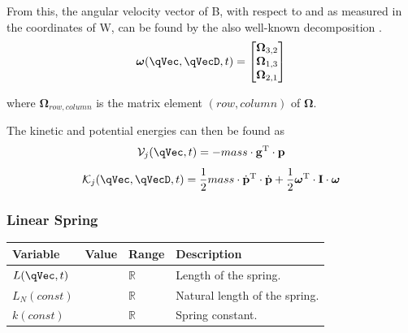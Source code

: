 \documentclass[11pt]{article}
\begin{document}
From this, the angular velocity vector of B, with respect to and as measured in the coordinates of W, can be found by the also well-known decomposition \cite{BJ3-43}.
\begin{equation}
    \bm{\omega}(\qVec, \qVecD, t) = \begin{bmatrix}\bm{\Omega}_{3,2} \\ \bm{\Omega}_{1,3} \\ \bm{\Omega}_{2,1}\end{bmatrix}
\end{equation}

where $\bm{\Omega}_{row,column}$ is the matrix element $(row,column)$ of $\bm{\Omega}$.

The kinetic and potential energies can then be found as
\begin{equation}
    \mathcal{V}_j(\qVec, t) = -mass\cdot\mathbf{g}^{\mathrm{T}} \cdot \mathbf{p}
\end{equation}
\begin{equation}
    \mathcal{K}_j(\qVec, \qVecD, t) = \frac{1}{2}mass\cdot\dot{\mathbf{p}}^{\mathrm{T}} \cdot \dot{\mathbf{p}}
    + \frac{1}{2}\bm{\omega}^{\mathrm{T}}\cdot \mathbf{I} \cdot \bm{\omega}
\end{equation}


\subsubsection{Linear Spring} \label{ssec:d:elements:spring}
\begin{center}
\begin{threeparttable}
\begin{tabular}{llll}
    \textbf{Variable} & \textbf{Value} & \textbf{Range} & \textbf{Description}\\
    \hline
    $L(\qVec, t)$
        &
        & $\mathbb{R}$
        & Length of the spring. \\
    $L_N(const)$
        &
        & $\mathbb{R}$
        & Natural length of the spring. \\
    $k(const)$
        &
        & $\mathbb{R}$
        & Spring constant. \\
\end{tabular}
\end{threeparttable}
\end{center}
\end{document}

